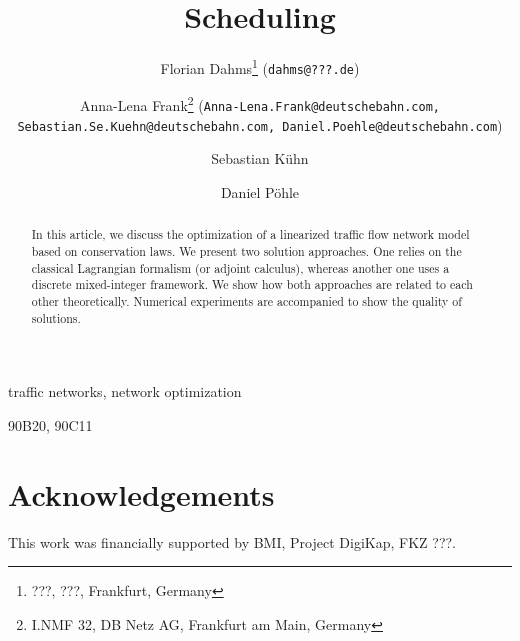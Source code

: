 \documentclass[final]{siamltex}
\title{Scheduling}
\author{
Florian Dahms\thanks{???, ???, Frankfurt, Germany} ({\tt dahms@???.de})
\and Anna-Lena Frank\thanks{I.NMF 32, DB Netz AG, Frankfurt am Main, Germany} ({\tt Anna-Lena.Frank@deutschebahn.com, Sebastian.Se.Kuehn@deutschebahn.com, Daniel.Poehle@deutschebahn.com})
\and Sebastian K\"uhn\footnotemark[2]
\and Daniel P\"ohle\footnotemark[2]}
\numberwithin{equation}{section}
\begin{document}
\maketitle

\begin{abstract} %
In this article, we discuss the optimization of
a linearized traffic flow network model based on conservation laws.
We present two solution approaches. One relies on the classical Lagrangian formalism
(or adjoint calculus), whereas another one uses a discrete mixed-integer framework.
We show how both approaches are related to each other theoretically.
Numerical experiments are accompanied to show the quality of solutions.
\end{abstract}

\begin{keywords}
traffic networks, network optimization
\end{keywords}

\begin{AMS}
90B20, 90C11
\end{AMS}

\pagestyle{myheadings}
\thispagestyle{plain}












%

\section*{Acknowledgements}
This work was financially supported by BMI, Project DigiKap, FKZ ???.

%



\end{document}
